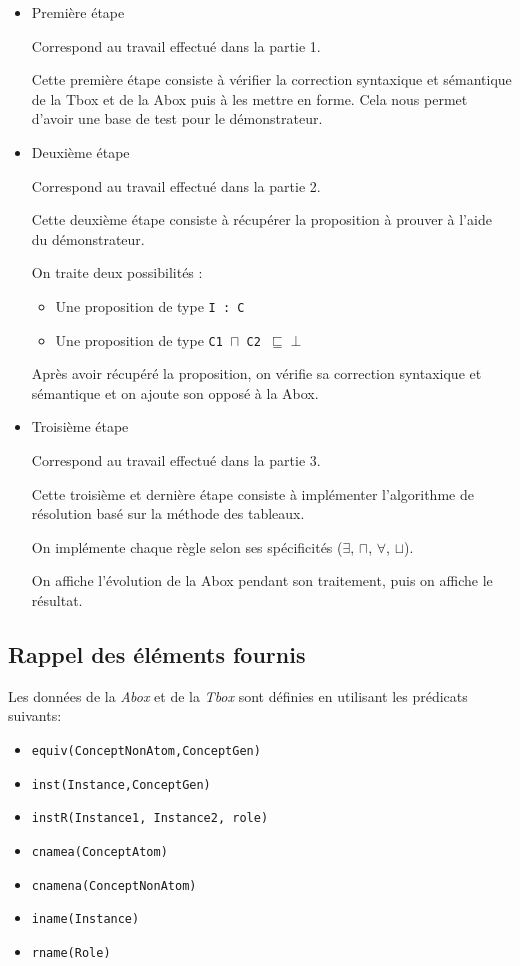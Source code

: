 \documentclass{article}
\newcommand{\code}[1]{\colorbox{light-gray}{\texttt{#1}}}
\begin{document}
\begin{itemize}
    \item Première étape

    Correspond au travail effectué dans la partie 1.

    Cette première étape consiste à vérifier la correction syntaxique et sémantique de la Tbox et de la Abox puis à les mettre en forme. Cela nous permet d'avoir une base de test pour le démonstrateur.
    
    \item Deuxième étape

    Correspond au travail effectué dans la partie 2.

    Cette deuxième étape consiste à récupérer la proposition à prouver à l'aide du démonstrateur. 

    On traite deux possibilités : 
    \begin{itemize}
        \item Une proposition de type \code{I : C}
        \item Une proposition de type \code{C1 $\sqcap$ C2 $\sqsubseteq \perp$}
    \end{itemize}

    Après avoir récupéré la proposition, on vérifie sa correction syntaxique et sémantique et on ajoute son opposé à la Abox.

    \item Troisième étape

    Correspond au travail effectué dans la partie 3.

    Cette troisième et dernière étape consiste à implémenter l'algorithme de résolution basé sur la méthode des tableaux.

    On implémente chaque règle selon ses spécificités ($\exists$, $\sqcap$, $\forall$, $\sqcup$).

    On affiche l'évolution de la Abox pendant son traitement, puis on affiche le résultat.
    
\end{itemize}

\subsection{Rappel des éléments fournis}
Les données de la \textit{Abox} et de la \textit{Tbox} sont définies en utilisant les prédicats suivants:
\begin{itemize}
    \item \code{equiv(ConceptNonAtom,ConceptGen)} 
    \item \code{inst(Instance,ConceptGen)}
    \item \code{instR(Instance1, Instance2, role)}
    \item \code{cnamea(ConceptAtom)}
    \item \code{cnamena(ConceptNonAtom)}
    \item \code{iname(Instance)}
    \item \code{rname(Role)}
\end{itemize}
\end{document}
